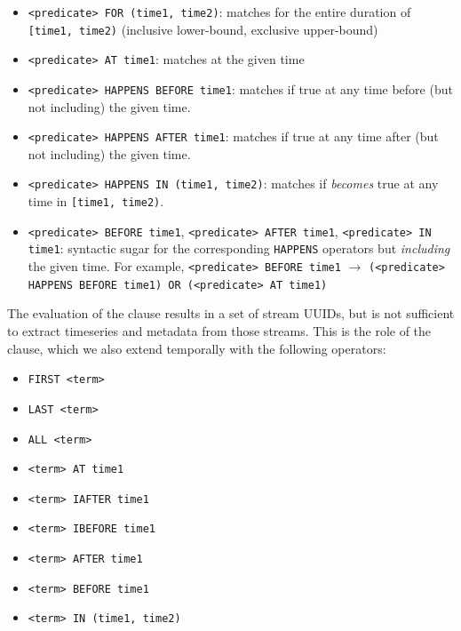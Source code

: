 \begin{itemize}
\item \texttt{<predicate> FOR (time1, time2)}: matches 
for the entire duration of \texttt{[time1, time2)} (inclusive lower-bound, exclusive upper-bound)

\item \texttt{<predicate> AT time1}: matches  at the given time

\item \texttt{<predicate> HAPPENS BEFORE time1}: matches if  true at any time before (but not including)
the given time.

\item \texttt{<predicate> HAPPENS AFTER time1}: matches if  true at any time after (but not including)
the given time.

\item \texttt{<predicate> HAPPENS IN (time1, time2)}: matches if  \emph{becomes} true at any time in \texttt{[time1, time2)}.

\item \texttt{<predicate> BEFORE time1}, \texttt{<predicate> AFTER time1}, \texttt{<predicate> IN time1}: syntactic sugar for the corresponding
\texttt{HAPPENS} operators but \emph{including} the given time. For example, \texttt{<predicate> BEFORE time1} $\rightarrow$ \texttt{(<predicate>
HAPPENS BEFORE time1) OR (<predicate> AT time1)}
\end{itemize}


The evaluation of the  clause results in a set of stream UUIDs,
but is not sufficient to extract timeseries and metadata from those streams.
This is the role of the  clause, which we also extend
temporally with the following operators:

\begin{itemize}
\item \texttt{FIRST <term>}
\item \texttt{LAST <term>}
\item \texttt{ALL <term>}
\item \texttt{<term> AT time1}
\item \texttt{<term> IAFTER time1}
\item \texttt{<term> IBEFORE time1}
\item \texttt{<term> AFTER time1}
\item \texttt{<term> BEFORE time1}
\item \texttt{<term> IN (time1, time2)}
\end{itemize}

